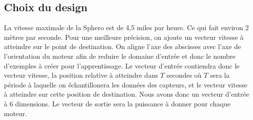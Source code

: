 \subsection{Choix du design}

La vitesse maximale de la Sphero est de 4,5 miles par heure\cite{product}.
Ce qui fait environ 2 mètres par seconde.
Pour une meilleure précision, on ajoute un vecteur vitesse à atteindre sur le point de destination.
On aligne l'axe des abscisses avec l'axe de l'orientation du moteur afin de reduire le domaine d'entrée et donc le nombre d'exemples à créer pour l'apprentissage.
Le vecteur d'entrée contiendra donc le vecteur vitesse, la position relative à atteindre dans $T$ secondes où $T$ sera la période à laquelle on échantillonera les données des capteurs, et le vecteur vitesse à atteindre sur cette position de destination.
Nous avons donc un vecteur d'entrée à 6 dimensions.
Le vecteur de sortie sera la puissance à donner pour chaque moteur.